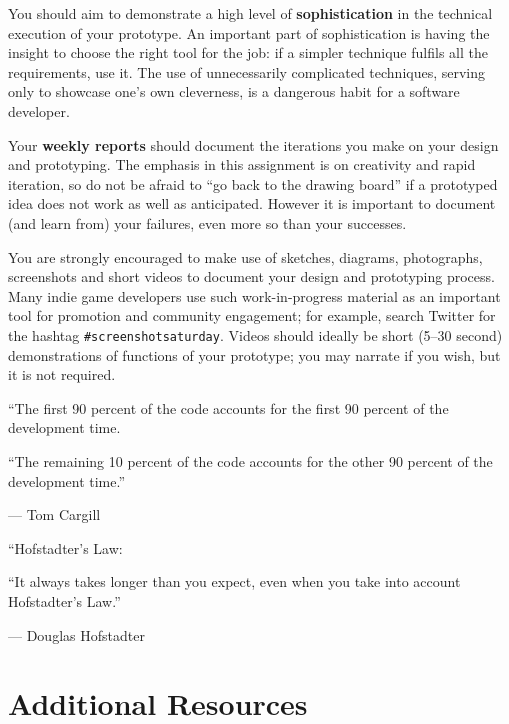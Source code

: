 \documentclass{../fal_assignment}
\begin{document}
You should aim to demonstrate a high level of \textbf{sophistication}
in the technical execution of your prototype.
An important part of sophistication is having the insight to choose the right tool for the job:
if a simpler technique fulfils all the requirements, use it.
The use of unnecessarily complicated techniques, serving only to showcase one's own cleverness,
is a dangerous habit for a software developer.

Your \textbf{weekly reports} should document the iterations you make on your design and prototyping.
The emphasis in this assignment is on creativity and rapid iteration,
so do not be afraid to ``go back to the drawing board'' if a prototyped idea does not work as well as anticipated.
However it is important to document (and learn from) your failures, even more so than your successes.

You are strongly encouraged to make use of sketches, diagrams, photographs, screenshots
and short videos to document your design and prototyping process.
Many indie game developers use such work-in-progress material as an important tool for promotion
and community engagement; for example, search Twitter for the hashtag \texttt{\#screenshotsaturday}.
Videos should ideally be short (5--30 second) demonstrations of functions of your prototype;
you may narrate if you wish, but it is not required.

\begin{marginquote}
    ``The first 90 percent of the code accounts for the first 90 percent of the development time.
    
    ``The remaining 10 percent of the code accounts for the other 90 percent of the development time.''
    
    --- Tom Cargill
    
    \marginquoterule
    
    ``Hofstadter's Law:
    
    ``It always takes longer than you expect, even when you take into account Hofstadter's Law.''
    
    --- Douglas Hofstadter
\end{marginquote}
\section*{Additional Resources}
\end{document}
